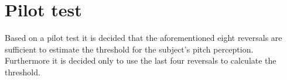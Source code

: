 \section*{Pilot test}
%
Based on a pilot test it is decided that the aforementioned eight reversals are sufficient to estimate the threshold for the subject's pitch perception. Furthermore it is decided only to use the last four reversals to calculate the threshold.  